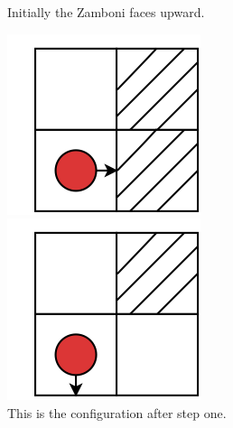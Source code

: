 \documentclass[a4paper,11pt]{article}
\begin{document}
{\begin{figure}[!htb]
  \caption{Initially the Zamboni faces upward.}\label{fig:awesome_image1}
\endminipage\hfill
{}
  \includegraphics[width=\linewidth]{step2pt1.png}
  \caption{This is the configuration after step one.}\label{fig:awesome_image2}
\endminipage\hfill
{}%
  \includegraphics[width=\linewidth]{step3pt1.png}

\end{figure}}
\end{document}
